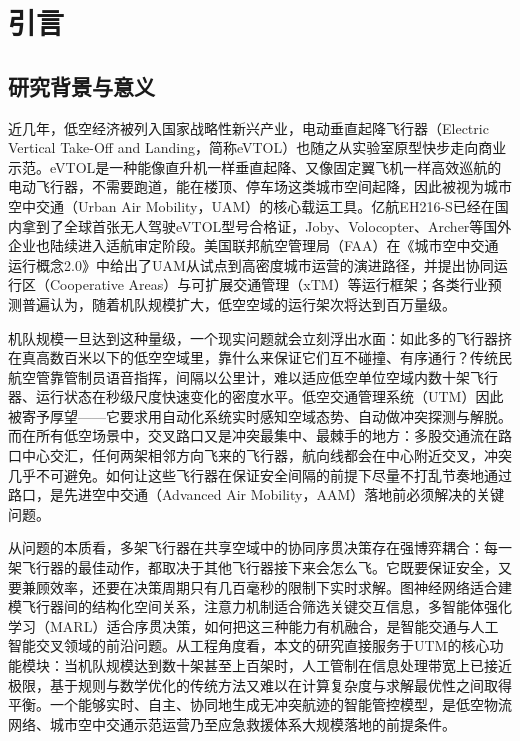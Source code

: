 \documentclass[12pt,a4paper,UTF8]{ctexart}
\begin{document}
\section{引言}

\subsection{研究背景与意义}

近几年，低空经济被列入国家战略性新兴产业，电动垂直起降飞行器（Electric Vertical Take-Off and Landing，简称eVTOL）也随之从实验室原型快步走向商业示范。eVTOL是一种能像直升机一样垂直起降、又像固定翼飞机一样高效巡航的电动飞行器，不需要跑道，能在楼顶、停车场这类城市空间起降，因此被视为城市空中交通（Urban Air Mobility，UAM）\cite{ref45}的核心载运工具。亿航EH216-S已经在国内拿到了全球首张无人驾驶eVTOL型号合格证，Joby、Volocopter、Archer等国外企业也陆续进入适航审定阶段。美国联邦航空管理局（FAA）在《城市空中交通运行概念2.0》中给出了UAM从试点到高密度城市运营的演进路径，并提出协同运行区（Cooperative Areas）与可扩展交通管理（xTM）等运行框架\cite{ref1}；各类行业预测普遍认为，随着机队规模扩大，低空空域的运行架次将达到百万量级。

机队规模一旦达到这种量级，一个现实问题就会立刻浮出水面：如此多的飞行器挤在真高数百米以下的低空空域里，靠什么来保证它们互不碰撞、有序通行？传统民航空管靠管制员语音指挥，间隔以公里计，难以适应低空单位空域内数十架飞行器、运行状态在秒级尺度快速变化的密度水平。低空交通管理系统（UTM）因此被寄予厚望——它要求用自动化系统实时感知空域态势、自动做冲突探测与解脱。而在所有低空场景中，交叉路口又是冲突最集中、最棘手的地方：多股交通流在路口中心交汇，任何两架相邻方向飞来的飞行器，航向线都会在中心附近交叉，冲突几乎不可避免。如何让这些飞行器在保证安全间隔的前提下尽量不打乱节奏地通过路口，是先进空中交通（Advanced Air Mobility，AAM）落地前必须解决的关键问题。

从问题的本质看，多架飞行器在共享空域中的协同序贯决策存在强博弈耦合：每一架飞行器的最佳动作，都取决于其他飞行器接下来会怎么飞。它既要保证安全，又要兼顾效率，还要在决策周期只有几百毫秒的限制下实时求解。图神经网络适合建模飞行器间的结构化空间关系，注意力机制适合筛选关键交互信息，多智能体强化学习（MARL）适合序贯决策，如何把这三种能力有机融合，是智能交通与人工智能交叉领域的前沿问题。从工程角度看，本文的研究直接服务于UTM的核心功能模块：当机队规模达到数十架甚至上百架时，人工管制在信息处理带宽上已接近极限，基于规则与数学优化的传统方法又难以在计算复杂度与求解最优性之间取得平衡。一个能够实时、自主、协同地生成无冲突航迹的智能管控模型，是低空物流网络、城市空中交通示范运营乃至应急救援体系大规模落地的前提条件。
\end{document}
